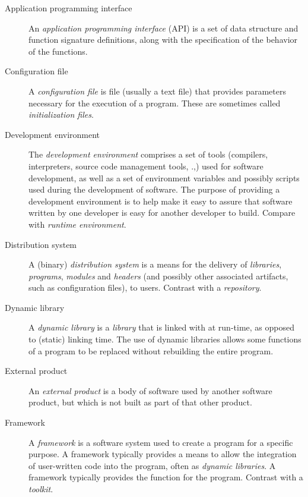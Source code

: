 \documentclass[draftmode,draftwater]{memarticle}
\begin{document}
\begin{description}

\item[Application programming interface] An \emph{application
    programming interface} (API) is a set of data structure and function
  signature definitions, along with the specification of the behavior of
  the functions.

\item[Configuration file] A \emph{configuration file} is file (usually a
  text file) that provides parameters necessary for the execution of a
  program. These are sometimes called \emph{initialization files}.

\item[Development environment] The \emph{development environment}
  comprises a set of tools (compilers, interpreters, source code
  management tools, \etc.,) used for software development, as well as a
  set of environment variables and possibly scripts used during the
  development of software. The purpose of providing a development
  environment is to help make it easy to assure that software written by
  one developer is easy for another developer to build. Compare with
  \emph{runtime environment}.

\item[Distribution system] A (binary) \emph{distribution system} is a
  means for the delivery of \emph{libraries}, \emph{programs},
  \emph{modules} and \emph{headers} (and possibly other associated
  artifacts, such as configuration files), to users. Contrast with a
  \emph{repository}.

\item[Dynamic library] A \emph{dynamic library} is a \emph{library} that
  is linked with at run-time, as opposed to (static) linking time. The
  use of dynamic libraries allows some functions of a program to be
  replaced without rebuilding the entire program.

\item[External product] An \emph{external product} is a body of software
  used by another software product, but which is not built as part of
  that other product.

\item[Framework] A \emph{framework} is a software system used to create
  a program for a specific purpose. A framework typically provides a
  means to allow the integration of user-written code into the program,
  often as \emph{dynamic libraries}. A framework typically provides the
   function for the program. Contrast with a \emph{toolkit}.


\end{description}
\end{document}
